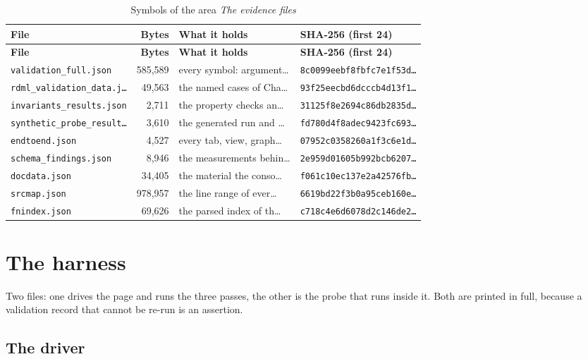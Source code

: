 {\small
\begin{xltabular}{\linewidth}{|l|r|X|X|}
\caption{Symbols of the area \emph{The evidence files}}\\
\hline

\hline \textbf{File} & \textbf{Bytes} & \textbf{What it holds} & \textbf{SHA-256 (first 24)} \\\hline\endfirsthead
\hline \textbf{File} & \textbf{Bytes} & \textbf{What it holds} & \textbf{SHA-256 (first 24)} \\\hline\endhead
\texttt{validation\_full.json} & 585,589 & every symbol: argument… & \texttt{8c0099eebf8fbfc7e1f53d…} \\ \hline
\texttt{rdml\_validation\_data.j…} & 49,563 & the named cases of Cha… & \texttt{93f25eecbd6dcccb4d13f1…} \\ \hline
\texttt{invariants\_results.json} & 2,711 & the property checks an… & \texttt{31125f8e2694c86db2835d…} \\ \hline
\texttt{synthetic\_probe\_result…} & 3,610 & the generated run and … & \texttt{fd780d4f8adec9423fc693…} \\ \hline
\texttt{endtoend.json} & 4,527 & every tab, view, graph… & \texttt{07952c0358260a1f3c6e1d…} \\ \hline
\texttt{schema\_findings.json} & 8,946 & the measurements behin… & \texttt{2e959d01605b992bcb6207…} \\ \hline
\texttt{docdata.json} & 34,405 & the material the conso… & \texttt{f061c10ec137e2a42576fb…} \\ \hline
\texttt{srcmap.json} & 978,957 & the line range of ever… & \texttt{6619bd22f3b0a95ceb160e…} \\ \hline
\texttt{fnindex.json} & 69,626 & the parsed index of th… & \texttt{c718c4e6d6078d2c146de2…} \\ \hline
\end{xltabular}}


\section{The harness}
Two files: one drives the page and runs the three passes, the other is the probe
that runs inside it. Both are printed in full, because a validation record that
cannot be re-run is an assertion.

\subsection*{The driver}


